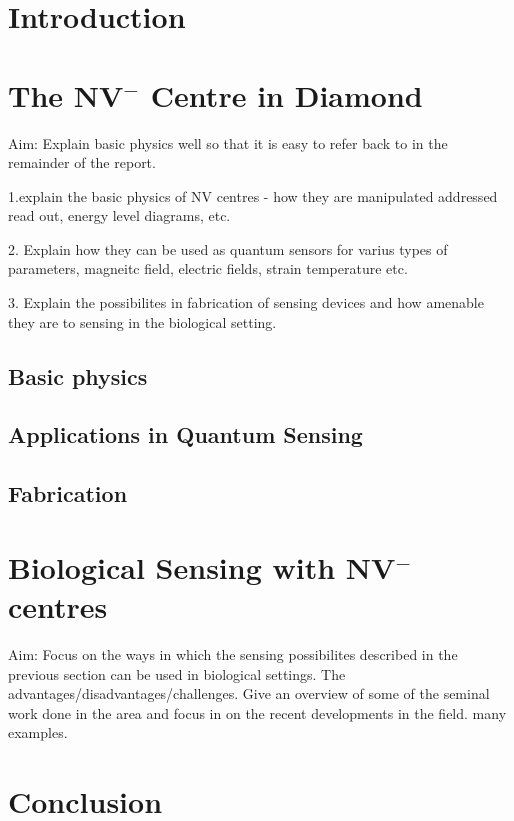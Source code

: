 \documentclass[12pt]{article}
\begin{document}
\section{Introduction}
\section{The NV$^-$ Centre in Diamond}
Aim: Explain basic physics well so that it is easy to refer back to in the remainder of the report. 

1.explain the basic physics of NV centres - how they are manipulated addressed read out, energy level diagrams, etc.

2. Explain how they can be used as quantum sensors for varius types of parameters, magneitc field, electric fields, strain temperature etc.

3. Explain the possibilites in fabrication of sensing devices and how amenable they are to sensing in the biological setting. 

\subsection{Basic physics}
\subsection{Applications in Quantum Sensing}
\subsection{Fabrication}


\section{Biological Sensing with NV$^-$ centres}
Aim: Focus on the ways in which the sensing possibilites described in the previous section can be used in biological settings. The advantages/disadvantages/challenges. Give an overview of some of the seminal work done in the area and focus in on the recent developments in the field. many examples. 

\section{Conclusion}
\cite{maletinsky2012robust}

\newpage
\printbibliography
\end{document}
